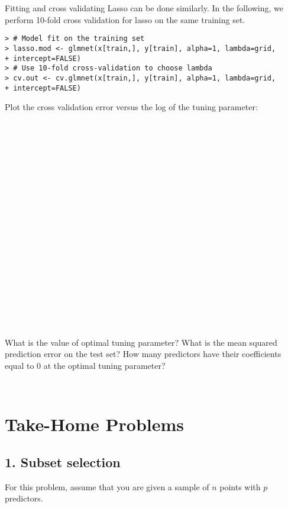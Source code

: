 \documentclass{article}
\begin{document}
\begin{Verbatim}[frame=single]


















\end{Verbatim}
Fitting and cross validating Lasso can be done similarly. In the following, we
perform 10-fold cross validation for lasso on the same training set.

\begin{Verbatim}[frame=single]
> # Model fit on the training set
> lasso.mod <- glmnet(x[train,], y[train], alpha=1, lambda=grid,
+ intercept=FALSE)
> # Use 10-fold cross-validation to choose lambda
> cv.out <- cv.glmnet(x[train,], y[train], alpha=1, lambda=grid,
+ intercept=FALSE)
\end{Verbatim}

Plot the cross validation error versus the log of the tuning parameter:

\begin{Verbatim}[frame=single]






















\end{Verbatim}
What is the value of optimal tuning parameter? What is the mean squared
prediction error on the test set? How many predictors have their coefficients
equal to $0$ at the optimal tuning parameter?

\begin{Verbatim}[frame=single]


\end{Verbatim}

\newpage
\section*{Take-Home Problems}

\subsection*{1. Subset selection}
For this problem, assume that you are given a sample of $n$ points with $p$
predictors.
\end{document}
